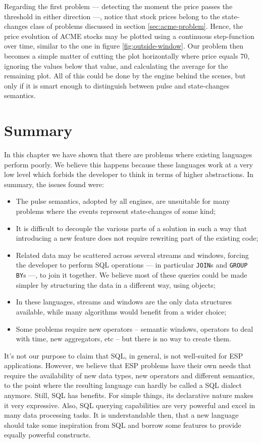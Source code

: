 Regarding the first problem --- detecting the moment the price passes
the threshold in either direction ---, notice that stock prices belong
to the state-changes class of problems discussed in section
\ref{sec:acme-problem}. Hence, the price evolution of ACME stocks may
be plotted using a continuous step-function over time, similar to the
one in figure \ref{fig:outside-window}. Our problem then becomes a
simple matter of cutting the plot horizontally where price equals 70,
ignoring the values below that value, and calculating the average for
the remaining plot. All of this could be done by the engine behind the
scenes, but only if it is smart enough to distinguish between pulse and
state-changes semantics.

\section{Summary}

In this chapter we have shown that there are problems where existing
languages perform poorly. We believe this happens because these
languages work at a very low level which forbids the developer to
think in terms of higher abstractions. In summary, the issues found
were:

\begin{itemize}
\item The pulse semantics, adopted by all engines, are unsuitable for
  many problems where the events represent state-changes of some kind;
\item It is difficult to decouple the various parts of a solution in
  such a way that introducing a new feature does not require rewriting
  part of the existing code;
\item Related data may be scattered across several streams and
  windows, forcing the developer to perform SQL operations --- in
  particular \verb=JOIN=s and \verb=GROUP BY=s ---, to join it
  together. We believe most of these queries could be made simpler by
  structuring the data in a different way, using objects;
\item In these languages, streams and windows are the only data
  structures available, while many algorithms would benefit from a wider
  choice;
\item Some problems require new operators -- semantic windows,
  operators to deal with time, new aggregators, etc -- but there is no
  way to create them.
\end{itemize}

It's not our purpose to claim that SQL, in general, is not well-suited
for ESP applications. However, we believe that ESP problems have their
own needs that require the availability of new data types, new
operators and different semantics, to the point where the resulting
language can hardly be called a SQL dialect anymore. Still, SQL has
benefits. For simple things, its declarative nature makes it very
expressive. Also, SQL querying capabilities are very powerful and
excel in many data processing tasks. It is understandable then, that a
new language should take some inspiration from SQL and borrow some
features to provide equally powerful constructs.
